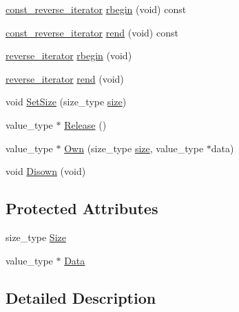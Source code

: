 \begin{DoxyCompactItemize}
\item 
\hyperlink{classvct_dynamic_vector_owner_ab157dd93c9061bb74e4a5983606e200a}{const\+\_\+reverse\+\_\+iterator} \hyperlink{classvct_dynamic_vector_owner_a0c4d0abbf9a438ffae1c3a5cf7877469}{rbegin} (void) const 
\item 
\hyperlink{classvct_dynamic_vector_owner_ab157dd93c9061bb74e4a5983606e200a}{const\+\_\+reverse\+\_\+iterator} \hyperlink{classvct_dynamic_vector_owner_afe560caeeef45f4fbd99ea6b02bdb290}{rend} (void) const 
\item 
\hyperlink{classvct_dynamic_vector_owner_a963d655b94fe07a9c7abbee2705005d1}{reverse\+\_\+iterator} \hyperlink{classvct_dynamic_vector_owner_a83591489616a140f3750314efd0b262c}{rbegin} (void)
\item 
\hyperlink{classvct_dynamic_vector_owner_a963d655b94fe07a9c7abbee2705005d1}{reverse\+\_\+iterator} \hyperlink{classvct_dynamic_vector_owner_a0a0aa16342ae5fe6ef5d97c2a0282296}{rend} (void)
\item 
void \hyperlink{classvct_dynamic_vector_owner_a71a733504a58a4b1776c11d66ecb8a6a}{Set\+Size} (size\+\_\+type \hyperlink{classvct_dynamic_vector_owner_a6a2cc98b79ff181f755df05a8d45780a}{size})
\item 
value\+\_\+type $\ast$ \hyperlink{classvct_dynamic_vector_owner_ad93bcc06c4ac4acdfb6fbcd8e7a279d2}{Release} ()
\item 
value\+\_\+type $\ast$ \hyperlink{classvct_dynamic_vector_owner_af2036e3557e3575ece8de77090ca503a}{Own} (size\+\_\+type \hyperlink{classvct_dynamic_vector_owner_a6a2cc98b79ff181f755df05a8d45780a}{size}, value\+\_\+type $\ast$data)
\item 
void \hyperlink{classvct_dynamic_vector_owner_a4a5a32779467d317910fc8db3a8cd79c}{Disown} (void)
\end{DoxyCompactItemize}
\subsection*{Protected Attributes}
\begin{DoxyCompactItemize}
\item 
size\+\_\+type \hyperlink{classvct_dynamic_vector_owner_a83223f1718c6ac4f9ec7eda64ba21b2e}{Size}
\item 
value\+\_\+type $\ast$ \hyperlink{classvct_dynamic_vector_owner_aa6c177cef7a3a1e4dd9eeed77dc4a111}{Data}
\end{DoxyCompactItemize}


\subsection{Detailed Description}
